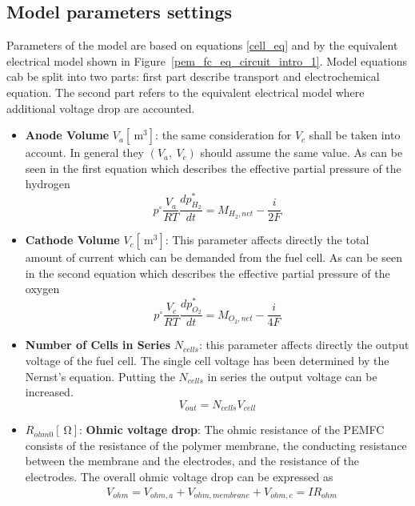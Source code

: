 \documentclass[12pt,a4paper]{scrartcl}
\begin{document}
\begin{onehalfspace}
\section{Model parameters settings}
Parameters of the model are based on equations \eqref{cell_eq} and by the equivalent electrical model shown in Figure~\ref{pem_fc_eq_circuit_intro_1}. Model equations cab be split into two parts: first part describe transport and electrochemical equation. The second part refers to the equivalent electrical model where additional voltage drop are accounted. 
\begin{itemize}
	\item[$-$] \textbf{Anode Volume} $V_a[\SI{}{\cubic\meter}]$: the same consideration for $V_c$ shall be taken into account. In general they $(V_a,\ V_c)$ should assume the same value. As can be seen in the first equation which describes the effective partial pressure of the hydrogen
	\begin{equation*}
		p^\circ\frac{V_a}{RT}\frac{dp_{H_2}^*}{dt} = M_{H_2,net} - 	\frac{i}{2F}
	\end{equation*}
	\item[$-$] \textbf{Cathode Volume} $V_c[\SI{}{\cubic\meter}]$: This parameter affects directly the total amount of current which can be demanded from the fuel cell. As can be seen in the second equation which describes the effective partial pressure of the oxygen 
	\begin{equation*}
		p^\circ\frac{V_c}{RT}\frac{dp_{O_2}^*}{dt} = M_{O_2,net} - 	\frac{i}{4F}
	\end{equation*}
	\item[$-$] \textbf{Number of Cells in Series} $N_{cells}$: this parameter affects directly the output voltage of the fuel cell. The single cell voltage has been determined by the Nernst's equation. Putting the $N_{cells}$ in series the output voltage can be increased.
	\begin{equation*}
		V_{out} = N_{cells}V_{cell}
	\end{equation*}
	\item[$-$] $R_{ohm0}[\SI{}{\ohm}]$: \textbf{Ohmic voltage drop}: The ohmic resistance of the PEMFC consists of the resistance of the polymer membrane, the conducting resistance between the membrane and the electrodes, and the resistance of the electrodes. The overall ohmic voltage drop can be expressed as \begin{equation*}
		\begin{aligned}
			&	V_{ohm} = V_{ohm,a} + V_{ohm,membrane} + V_{ohm,c} = IR_{ohm} \\[8pt]

\end{aligned}
\end{equation*}
\end{itemize}
\end{onehalfspace}
\end{document}
